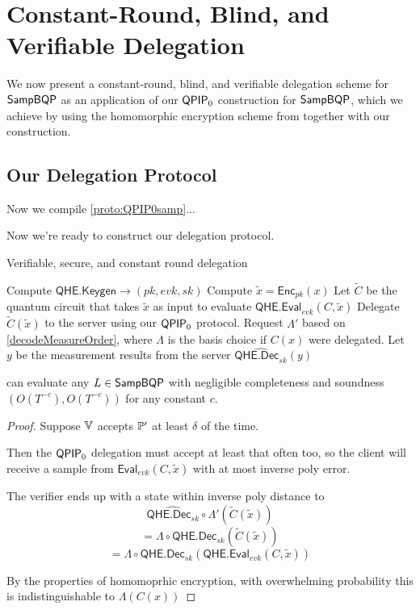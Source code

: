 \section{Constant-Round, Blind, and Verifiable Delegation}

We now present a constant-round, blind, and verifiable delegation scheme for $\operatorname{\mathsf{SampBQP}}$ as an application of our $\operatorname{\mathsf{QPIP}}_0$ construction for $\operatorname{\mathsf{SampBQP}}$,
which we achieve by using the homomorphic encryption scheme from \cite{mahadev_qfhe} together with our construction.

\subsection{Our Delegation Protocol}

Now we compile \cref{proto:QPIP0samp}...

Now we're ready to construct our delegation protocol.

\begin{algorithm}
	\caption{Verifiable, secure, and constant round delegation}
	\label{ProtoPriv}
	\begin{algorithmic}[1]
			\State Compute $\mathsf{QHE.Keygen}\rightarrow(pk, evk, sk)$
			\State Compute $\tilde{x}=\mathsf{Enc}_{pk}(x)$
			\State Let $\tilde{C}$ be the quantum circuit that takes $\tilde{x}$ as input to evaluate $\mathsf{QHE.Eval}_{evk}(C, \tilde{x})$
			\State Delegate $\tilde{C}(\tilde{x})$ to the server using our $\operatorname{\mathsf{QPIP}}_0$ protocol.
			\State Request $\Lambda'$ based on \autoref{decodeMeasureOrder}, where $\Lambda$ is the basis choice if $C(x)$ were delegated.
			\State Let $y$ be the measurement results from the server
			\State \Return $\widehat{\mathsf{QHE.Dec}_{sk}}(y)$
		\EndProcedure
	\end{algorithmic}
\end{algorithm}

\begin{thm}
    \label{QPIP1thm}
	 can evaluate any $L\in\operatorname{\mathsf{SampBQP}}$ with negligible completeness and soundness $(O(T^{-c}), O(T^{-c}))$ for any constant $c$.
\end{thm}
\begin{proof}
	Suppose $\mathbb{V}$ accepts $\mathbb{P}'$ at least $\delta$ of the time.

	Then the $\operatorname{\mathsf{QPIP}}_0$ delegation must accept at least that often too,
	so the client will receive a sample from $\mathsf{Eval}_{evk}(C, \tilde{x})$ with at most inverse poly error. 

	The verifier ends up with a state within inverse poly distance to
		$$\widehat{\mathsf{QHE.Dec}_{sk}}\circ\Lambda'(\tilde{C}(\tilde{x}))$$
		$$=\Lambda\circ\mathsf{QHE.Dec}_{sk}(\tilde{C}(\tilde{x}))$$
		$$=\Lambda\circ\mathsf{QHE.Dec}_{sk}(\mathsf{QHE.Eval}_{evk}(C, \tilde{x}))$$

	By the properties of homomoprhic encryption, with overwhelming probability this is indistinguishable to  $\Lambda(C(x))$
\end{proof}

